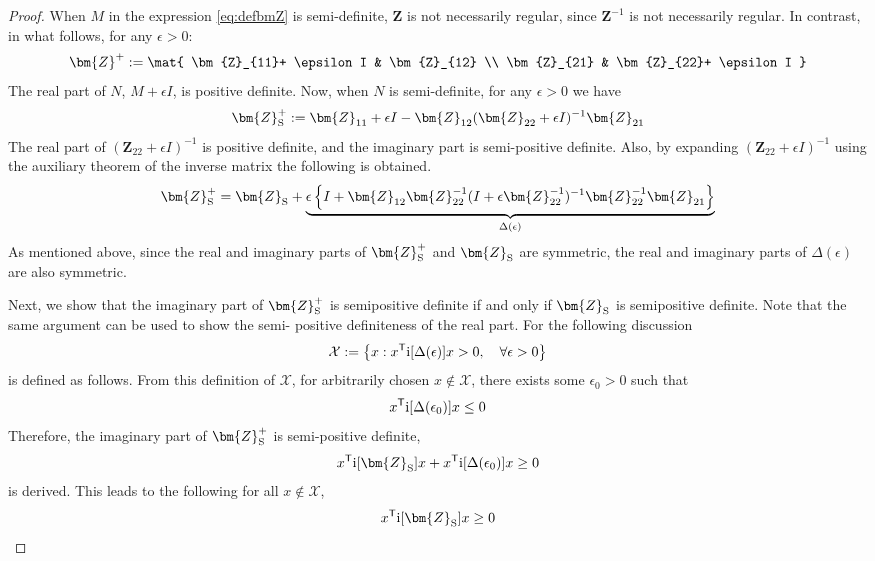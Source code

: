 \documentclass[graybox, envcountchap]{svmult}
\begin{document}
\begin{proof}
When $M$ in the expression \ref{eq:defbmZ} is semi-definite, $\bm{Z}$ is not necessarily regular, since $\bm{Z}^{-1}$ is not necessarily regular.
In contrast, in what follows, for any $\epsilon >0$:
\begin{align*}
\bm{Z}^{+}
:=
\mat{
\bm{Z}_{11}+ \epsilon I & \bm{Z}_{12} \\
\bm{Z}_{21} & \bm{Z}_{22}+ \epsilon I
}
\end{align*}
The real part of $N$, $M+\epsilon I$, is positive definite.
Now, when $N$ is semi-definite, for any $\epsilon >0$ we have
\begin{align*}
\bm{Z}_{\rm S}^{+}:=\bm{Z}_{11} + \epsilon I - \bm{Z}_{12} (\bm{Z}_{22}+ \epsilon I)^{-1}\bm{Z}_{21}
\end{align*}
The real part of $(\bm{Z}_{22}+ \epsilon I)^{-1}$ is positive definite, and the imaginary part is semi-positive definite.
Also, by expanding $(\bm{Z}_{22}+ \epsilon I)^{-1}$ using the auxiliary theorem of the inverse matrix the following is obtained.
\begin{align*}
\bm{Z}_{\rm S}^{+}=
\bm{Z}_{\rm S}
+ \underbrace{
\epsilon
\left\{
I + \bm{Z}_{12} \bm{Z}_{22}^{-1}
(I +\epsilon \bm{Z}_{22}^{-1} )^{-1}
\bm{Z}_{22}^{-1}\bm{Z}_{21}
\right\}
}_{\Delta(\epsilon)}
\end{align*}
As mentioned above, since the real and imaginary parts of $\bm{Z}_{\rm S}^{+}$ and $\bm{Z}_{\rm S}$ are symmetric,
the real and imaginary parts of $\Delta(\epsilon)$ are also symmetric.

Next, we show that the imaginary part of $\bm{Z}_{\rm S}^{+}$ is semipositive definite if and only if $\bm{Z}_{\rm S}$ is semipositive definite.
Note that the same argument can be used to show the semi- positive definiteness of the real part.
For the following discussion
\begin{align*}
\mathcal{X} := \left\{
x: 
x^{\sf T} {\rm i}[\Delta (\epsilon)] x >0
,\quad 
\forall \epsilon >0
\right\}
\end{align*}
is defined as follows.
From this definition of $\mathcal{X}$, for arbitrarily chosen $x \notin \mathcal{X}$, there exists some $\epsilon_0 >0$ such that
\[
x^{\sf T} {\rm i}[\Delta(\epsilon_0)]x \leq 0
\]
Therefore, the imaginary part of $ \bm{Z}_{\rm S}^{+} $ is semi-positive definite, 
\begin{align*}
x^{\sf T} \imag [\bm{Z}_{\rm S}] x + x^{\sf T} \imag[\Delta(\epsilon_0)]x \geq 0
\end{align*}
is derived.
This leads to the following for all $x \notin \mathcal{X}$, 
\begin{align}\label{eq:xZxgeq}
x^{\sf T}\imag[\bm{Z}_{\rm S}] x \geq 0
\end{align}


\end{proof}
\end{document}
